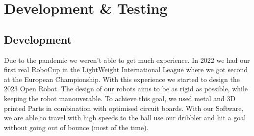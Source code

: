 \documentclass{scrartcl}
\begin{document}
\section{Development \& Testing}

\subsection{Development}
Due to the pandemic we weren't able to get much experience. In 2022 we had our first real RoboCup
in the LightWeight International League where we got second at the European Championship. With this experience we started to design the 2023 Open Robot.
\newline
The design of our robots aims to be as rigid as possible, while keeping the robot manouverable.
To achieve this goal, we used metal and 3D printed Parts in combination with optimised circuit boards.
With our Software, we are able to travel with high speeds to the ball use our dribbler and
hit a goal without going out of bounce (most of the time).
\end{document}
